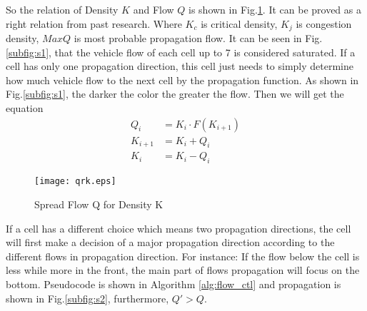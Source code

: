 \documentclass{mcmthesis}
\begin{document}
So the relation of Density $K$ and Flow $Q$ is shown in Fig.\ref{fig:qrk}. 
It can be proved as a right relation from past research\cite{wiki:trafficflow}. Where $K_c$ is critical density,  $K_j$ is congestion density, $ MaxQ$  is most probable propagation flow. It can be seen in Fig.\ref{subfig:s1}, that the vehicle flow of each cell up to 7 is considered saturated. If a cell has only one propagation direction, this cell just needs to simply determine how much vehicle flow to the next cell by the propagation function. As shown in Fig.\ref{subfig:s1}, the darker the color
the greater the flow.
Then we will get the equation 
\begin{align*}
Q_i&=K_{i} \cdot F(K_{i+1})\\
K_{i+1}&=K_i+Q_i\\
K_{i}&=K_i-Q_i
\end{align*}
\begin{figure}[!htbp]
	\small
	\centering
	\texttt{[image: qrk.eps]}
	\caption{\label{fig:qrk}Spread Flow Q for Density K} 
\end{figure}

If a cell has a different choice which means two propagation directions, the cell will first make a decision of a major propagation direction according to the different flows in propagation direction. For instance: If the flow below the cell is less while more in the front, the main part of flows propagation will focus on the bottom. Pseudocode is shown in Algorithm \ref{alg:flow_ctl} and propagation is shown in Fig.\ref{subfig:s2}, furthermore, $Q' > Q.$
\end{document}
